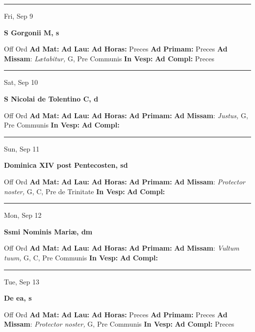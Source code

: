 \documentclass[letterpaper, 10pt]{article}
\begin{document}
\hrule
\begin{center}
Fri, Sep 9
\end{center}\textbf{ \large S Gorgonii M, \textnormal{\normalsize s}}
\begin{justify}
Off Ord
\textbf{Ad Mat: }
\textbf{Ad Lau: }
\textbf{Ad Horas: }Preces
\textbf{Ad Primam: }Preces
\textbf{Ad Missam}: \textit{Lætabitur,} G, Pre Communis
\textbf{In Vesp: }
\textbf{Ad Compl: }Preces\end{justify}



\hrule
\begin{center}
Sat, Sep 10
\end{center}\textbf{ \large S Nicolai de Tolentino C, \textnormal{\normalsize d}}
\begin{justify}
Off Ord
\textbf{Ad Mat: }
\textbf{Ad Lau: }
\textbf{Ad Horas: }
\textbf{Ad Primam: }
\textbf{Ad Missam}: \textit{Justus,} G, Pre Communis
\textbf{In Vesp: }
\textbf{Ad Compl: }\end{justify}



\hrule
\begin{center}
Sun, Sep 11
\end{center}\textbf{ \large Dominica XIV post Pentecosten, \textnormal{\normalsize sd}}
\begin{justify}
Off Ord
\textbf{Ad Mat: }
\textbf{Ad Lau: }
\textbf{Ad Horas: }
\textbf{Ad Primam: }
\textbf{Ad Missam}: \textit{Protector noster,} G, C, Pre de Trinitate
\textbf{In Vesp: }
\textbf{Ad Compl: }\end{justify}



\hrule
\begin{center}
Mon, Sep 12
\end{center}\textbf{ \large Ssmi Nominis Mariæ, \textnormal{\normalsize dm}}
\begin{justify}
Off Ord
\textbf{Ad Mat: }
\textbf{Ad Lau: }
\textbf{Ad Horas: }
\textbf{Ad Primam: }
\textbf{Ad Missam}: \textit{Vultum tuum,} G, C, Pre Communis
\textbf{In Vesp: }
\textbf{Ad Compl: }\end{justify}



\hrule
\begin{center}
Tue, Sep 13
\end{center}\textbf{ \large De ea, \textnormal{\normalsize s}}
\begin{justify}
Off Ord
\textbf{Ad Mat: }
\textbf{Ad Lau: }
\textbf{Ad Horas: }Preces
\textbf{Ad Primam: }Preces
\textbf{Ad Missam}: \textit{Protector noster,} G, Pre Communis
\textbf{In Vesp: }
\textbf{Ad Compl: }Preces\end{justify}
\end{document}
